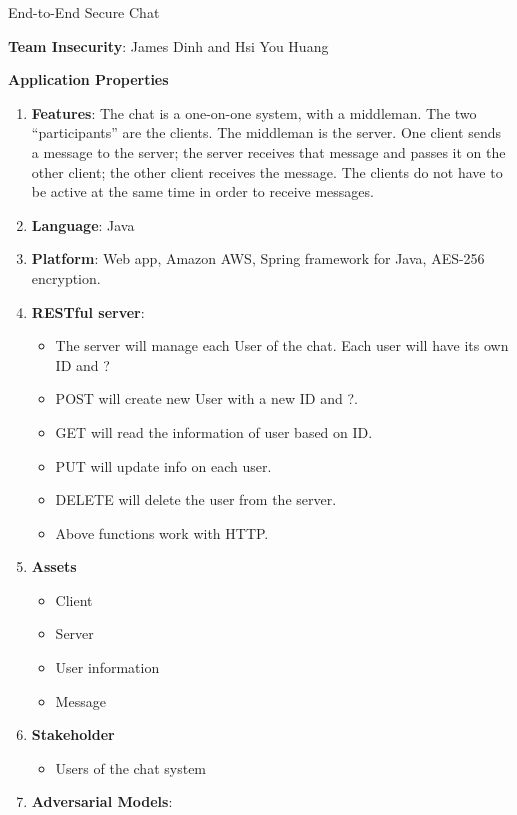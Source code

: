 \documentclass{article}
\begin{document}
End-to-End Secure Chat\newline

\textbf{Team Insecurity}: James Dinh and Hsi You Huang\newline

\textbf{Application Properties}\newline

\begin{enumerate}
	\item \textbf{Features}: The chat is a one-on-one system, with a middleman. The two
     “participants” are the clients. The middleman is the server. One client sends a message to the
     server; the server receives that message and passes it on the other client; the other client 
     receives the message. The clients do not have to be active at the same time in order to receive
     messages.
	\item \textbf{Language}: Java
    \item \textbf{Platform}: Web app, Amazon AWS, Spring framework for Java, AES-256 encryption.
    \item \textbf{RESTful server}:
    	\begin{itemize}
    		\item The server will manage each User of the chat. Each user will have its own ID and ?
         	\item POST will create new User with a new ID and ?.
            \item GET will read the information of user based on ID.
            \item PUT will update info on each user.
            \item DELETE will delete the user from the server.
            \item Above functions work with HTTP.
        \end{itemize}
	\item \textbf{Assets}
    	\begin{itemize}
        	\item Client
            \item Server
            \item User information
			\item Message
        \end{itemize} 
    \item \textbf{Stakeholder}
    	\begin{itemize}
        	\item Users of the chat system
        \end{itemize}
    \item \textbf{Adversarial Models}:
    	\begin {itemize}
  

\end{itemize}
\end{enumerate}
\end{document}
